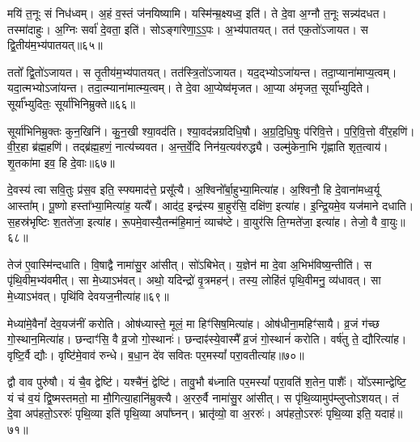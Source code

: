 मयि॑ त॒नूः सं निध॑ध्वम्।
अ॒हं व॒स्तं ज॑नयिष्यामि।
यस्मि॑न्म्र॒क्ष्यध्व॒ इति॑।
ते दे॒वा अ॒ग्नौ त॒नूः सन्न्य॑दधत।
तस्मा॑दाहुः।
अ॒ग्निः सर्वा॑ दे॒वता॒ इति॑।
सोऽङ्गा॑रेणा॒ऽ॒ऽ॒पः।
अ॒भ्य॑पातयत्।
तत॑ एक॒तो॑\-ऽजायत।
स द्वि॒तीय॑म॒भ्य॑\-पातयत्॥६५॥

ततो᳚ द्वि॒तो॑\-ऽजायत।
स तृ॒तीय॑म॒भ्य॑पातयत्।
तत॑स्त्रि॒तो॑\-ऽजायत।
यद॒द्भ्यो\-ऽजा॑यन्त।
तदा॒प्याना॑माप्य॒त्वम्।
यदा॒त्मभ्यो\-ऽजा॑यन्त।
तदा॒त्म्याना॑मात्म्य॒त्वम्।
ते दे॒वा आ॒प्येष्व॑मृजत।
आ॒प्या अ॑मृजत॒ सूर्या᳚भ्युदिते।
सूर्या᳚भ्युदितः॒ सूर्या॑भिनिम्रुक्ते॥६६॥

सूर्या॑भिनिम्रुक्तः कुन॒खिनि॑।
कु॒न॒खी श्या॒वद॑ति।
श्या॒वद॑न्नग्र\-दिधि॒षौ।
अ॒ग्र॒दि॒धि॒षुः प॑रिवि॒त्ते।
प॒रि॒वि॒त्तो वी॑र॒हणि॑।
वी॒र॒हा ब्र॑ह्म॒हणि॑।
तद्ब्र॑ह्म॒हणं॒ नात्य॑च्यवत।
अ॒न्त॒र्वे॒दि निन॑य॒त्यव॑रुद्ध्यै।
उल्मु॑केना॒भि गृ॑ह्णाति शृत॒त्वाय॑।
शृ॒तका॑मा इव॒ हि दे॒वाः॥६७॥\anuvakamend[अ॒न्या जि॑न्वन्त्यनु वि॒सृत्यै॒वमा॒हाशा᳚न्त आह॒ गुप्त्यै॑ छ॒न्नं ब्रह्मा᳚ब्रवीद्द्वि॒तीय॑म॒भ्य॑पातय॒थ्सूर्या॑भिनिम्रुक्ते दे॒वाः]

दे॒वस्य॑ त्वा सवि॒तुः प्र॑स॒व इति॒ स्फ्यमाद॑त्ते॒ प्रसू᳚त्यै।
अ॒श्विनो᳚र्बा॒हुभ्या॒मित्या॑ह।
अ॒श्विनौ॒ हि दे॒वाना॑मध्व॒र्यू आस्ता᳚म्।
पू॒ष्णो हस्ता᳚भ्या॒मित्या॑ह॒ यत्यै᳚।
आद॑द॒ इन्द्र॑स्य बा॒हुर॑सि॒ दक्षि॑ण॒ इत्या॑ह।
इ॒न्द्रि॒यमे॒व यज॑माने दधाति।
स॒हस्र॑भृष्टिः श॒तते॑जा॒ इत्या॑ह।
रू॒पमे॒वास्यै॒तन्म॑हि॒मानं॒ व्याच॑ष्टे।
वा॒युर॑सि ति॒ग्मते॑जा॒ इत्या॑ह।
तेजो॒ वै वा॒युः॥६८॥

तेज॑ ए॒वास्मि॑न्दधाति।
वि॒षाद्वै नामा॑सु॒र आ॑सीत्।
सो॑ऽबिभेत्।
य॒ज्ञेन॑ मा दे॒वा अ॒भिभ॑विष्य॒न्तीति॑।
स पृ॑थि॒वीम॒भ्य॑वमीत्।
सा मे॒ध्या\-ऽभ॑वत्।
अथो॒ यदिन्द्रो॑ वृ॒त्रमहन्॑।
तस्य॒ लोहि॑तं पृथि॒वीमनु॒ व्य॑धावत्।
सा मे॒ध्या\-ऽभ॑वत्।
पृथि॑वि देवयज॒नीत्या॑ह॥६९॥

मेध्या॑मे॒वैनां᳚ देव॒यज॑नीं करोति।
ओष॑ध्यास्ते॒ मूलं॒ मा हिꣳ॑सिष॒मित्या॑ह।
ओष॑धीना॒महिꣳ॑सायै।
व्र॒जं ग॑च्छ गो॒स्थान॒मित्या॑ह।
छन्दाꣳ॑सि॒ वै व्र॒जो गो॒स्थानः॑।
छन्दाꣴ॑स्ये॒वास्मै᳚ व्र॒जं गो॒स्थानं॑ करोति।
वर्\mbox{}ष॑तु ते॒ द्यौरित्या॑ह।
वृष्टि॒र्वै द्यौः।
वृष्टि॑मे॒वाव॑ रुन्धे।
ब॒धा॒न दे॑व सवितः पर॒मस्यां᳚ परा॒वतीत्या॑ह॥७०॥

द्वौ वाव पुरु॑षौ।
यं चै॒व द्वेष्टि॑।
यश्चै॑नं॒ द्वेष्टि॑।
तावु॒भौ ब॑ध्नाति पर॒मस्यां᳚ परा॒वति॑ श॒तेन॒ पाशैः᳚।
यो᳚ऽस्मान्द्वेष्टि॒ यं च॑ व॒यं द्वि॒ष्मस्तमतो॒ मा मौ॒गित्या॒हानि॑म्रुक्त्यै।
अ॒ररु॒र्वै नामा॑सु॒र आ॑सीत्।
स पृ॑थि॒व्यामुप॑म्लुप्तो\-ऽशयत्।
तं दे॒वा अप॑हतो॒\-ऽररुः॑ पृथि॒व्या इति॑ पृथि॒व्या अपा᳚घ्नन्।
भ्रातृ॑व्यो॒ वा अ॒ररुः॑।
अप॑हतो॒\-ऽररुः॑ पृथि॒व्या इति॒ यदाह॑॥७१॥

